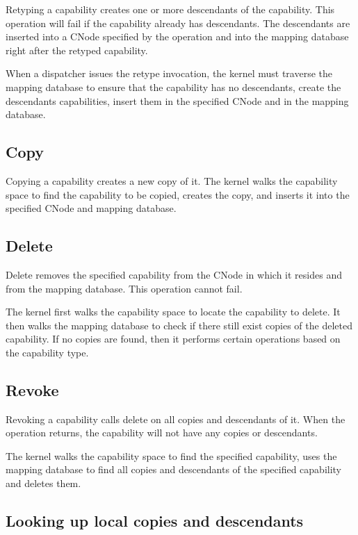 \documentclass[a4paper,twoside]{report} %
\begin{document}
Retyping a capability creates one or more descendants of the
capability. This operation will fail if the capability already has
descendants. The descendants are inserted into a CNode specified by
the operation and into the mapping database right after the retyped
capability.

When a dispatcher issues the retype invocation, the kernel must traverse the
mapping database to ensure that the capability has no descendants, create the
descendants capabilities, insert them in the specified CNode and in the mapping
database.

\subsection{Copy}

Copying a capability creates a new copy of it. The kernel walks the capability
space to find the capability to be copied, creates the copy, and inserts it
into the specified CNode and mapping database.

\subsection{Delete}

Delete removes the specified capability from the CNode in which it
resides and from the mapping database. This operation cannot fail.

The kernel first walks the capability space to locate the capability
to delete. It then walks the mapping database to check if there still
exist copies of the deleted capability. If no copies are found, then
it performs certain operations based on the capability type.

\subsection{Revoke}

Revoking a capability calls delete on all copies and descendants of
it. When the operation returns, the capability will not have any
copies or descendants.

The kernel walks the capability space to find the specified
capability, uses the mapping database to find all copies and
descendants of the specified capability and deletes them.

\subsection{Looking up local copies and descendants}
\end{document}
